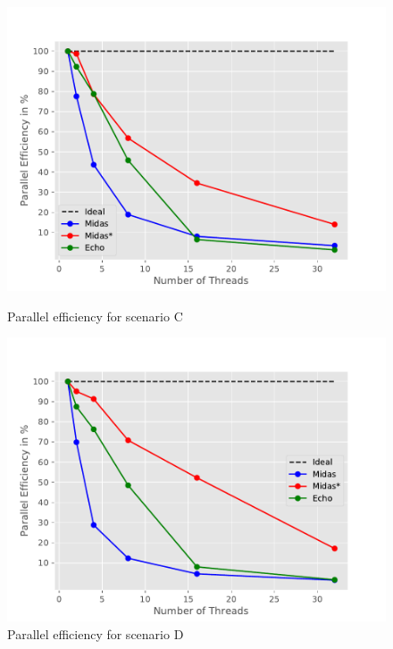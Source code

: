 \begin{figure}
\begin{minipage}[l]{0.50\textwidth}
        \includegraphics[width=\textwidth]{figures/bench/eff-ls}
        \caption{Parallel efficiency for scenario C}
\end{minipage}
\begin{minipage}[l]{0.50\textwidth}
        \includegraphics[width=\textwidth]{figures/bench/eff-ll}
        \caption{Parallel efficiency for scenario D}
\end{minipage}
\end{figure}

